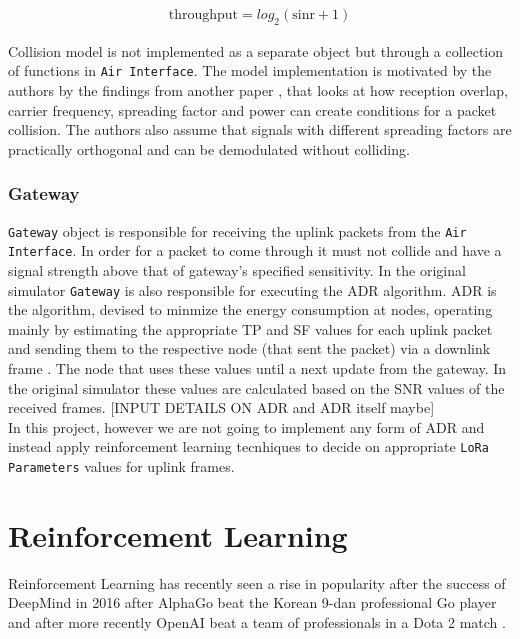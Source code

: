 \begin{align}
    \text{throughput} = \text{$log_{2}$}(\text{sinr} + 1)
\end{align}

Collision model is not implemented as a separate object but through a collection of functions in \texttt{Air Interface}. The model implementation is motivated by the authors \cite{simulator} by the findings from another paper \cite{collision_conditions}, that looks at how reception overlap, carrier frequency, spreading factor and power can create conditions for a packet collision. The authors \cite{simulator} also assume that signals with different spreading factors are practically orthogonal and can be demodulated without colliding.

\subsection{Gateway}

\texttt{Gateway} object is responsible for receiving 
the uplink packets from the \texttt{Air Interface}. In order for a packet to come through it must not collide and have  a signal strength above that of gateway's specified sensitivity. In the original simulator \cite{simulator} \texttt{Gateway} is also responsible for executing the ADR algorithm. ADR is the algorithm, devised to minmize the energy consumption at nodes, operating mainly by estimating the appropriate TP and SF values for each uplink packet and sending them to the respective node (that sent the packet) via a downlink frame \cite{simulator}. The node that uses these values until a next update from the gateway. In the original simulator these values are calculated based on the SNR values of the received frames. 
[INPUT DETAILS ON ADR and ADR itself maybe] \\

In this project, however we are not going to implement any form of ADR and instead apply reinforcement learning tecnhiques to 
decide on appropriate \texttt{LoRa Parameters} values for uplink frames.



\chapter{Reinforcement Learning} 

Reinforcement Learning has recently seen a rise in popularity after
the success of DeepMind in 2016 after AlphaGo beat the Korean 9-dan professional Go player \cite{alpha_go_lee_sedol} and after more recently OpenAI beat a team of professionals in a Dota 2 match \cite{dota}.\\

